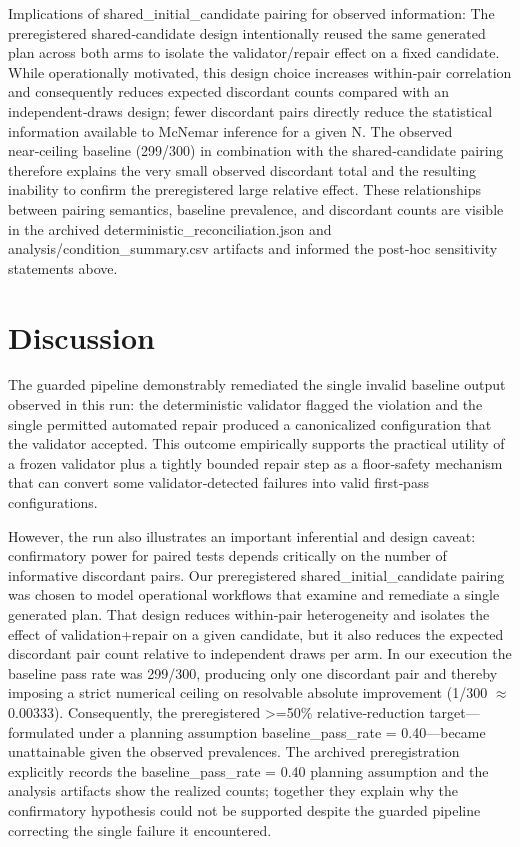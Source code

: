 \documentclass[conference]{IEEEtran}
\begin{document}
Implications of shared\_initial\_candidate pairing for observed information: The preregistered shared‑candidate design intentionally reused the same generated plan across both arms to isolate the validator/repair effect on a fixed candidate. While operationally motivated, this design choice increases within‑pair correlation and consequently reduces expected discordant counts compared with an independent‑draws design; fewer discordant pairs directly reduce the statistical information available to McNemar inference for a given N. The observed near‑ceiling baseline (299/300) in combination with the shared‑candidate pairing therefore explains the very small observed discordant total and the resulting inability to confirm the preregistered large relative effect. These relationships between pairing semantics, baseline prevalence, and discordant counts are visible in the archived deterministic\_reconciliation.json and analysis/condition\_summary.csv artifacts and informed the post‑hoc sensitivity statements above.

\section{Discussion}
The guarded pipeline demonstrably remediated the single invalid baseline output observed in this run: the deterministic validator flagged the violation and the single permitted automated repair produced a canonicalized configuration that the validator accepted. This outcome empirically supports the practical utility of a frozen validator plus a tightly bounded repair step as a floor‑safety mechanism that can convert some validator‑detected failures into valid first‑pass configurations.

However, the run also illustrates an important inferential and design caveat: confirmatory power for paired tests depends critically on the number of informative discordant pairs. Our preregistered shared\_initial\_candidate pairing was chosen to model operational workflows that examine and remediate a single generated plan. That design reduces within‑pair heterogeneity and isolates the effect of validation+repair on a given candidate, but it also reduces the expected discordant pair count relative to independent draws per arm. In our execution the baseline pass rate was 299/300, producing only one discordant pair and thereby imposing a strict numerical ceiling on resolvable absolute improvement (1/300 \ensuremath{\approx} 0.00333). Consequently, the preregistered >=50\% relative‑reduction target---formulated under a planning assumption baseline\_pass\_rate = 0.40---became unattainable given the observed prevalences. The archived preregistration explicitly records the baseline\_pass\_rate = 0.40 planning assumption and the analysis artifacts show the realized counts; together they explain why the confirmatory hypothesis could not be supported despite the guarded pipeline correcting the single failure it encountered.
\end{document}
